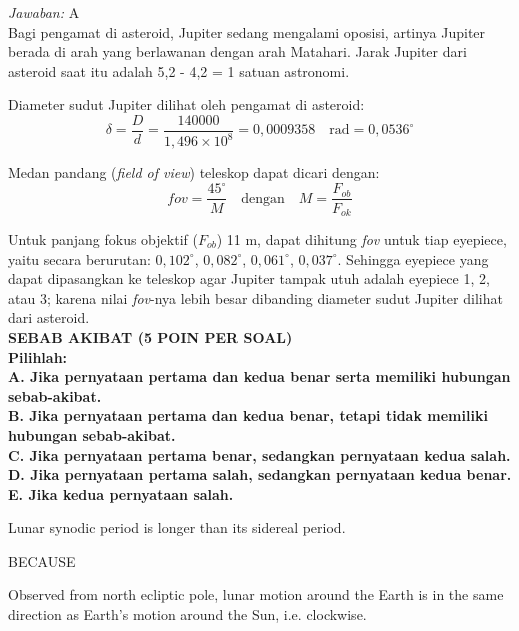 \documentclass[11pt,fleqn]{exam}
\begin{document}
\begin{questions}
\textit{Jawaban: } A\\

Bagi pengamat di asteroid, Jupiter sedang mengalami oposisi, artinya Jupiter berada di arah yang berlawanan dengan arah Matahari. Jarak Jupiter dari asteroid saat itu adalah 5,2 - 4,2 = 1 satuan astronomi.

Diameter sudut Jupiter dilihat oleh pengamat di asteroid:
\begin{equation*}
\delta = \frac{D}{d} = \frac{140000}{1,496 \times 10^{8}} = 0,0009358 \quad \text{rad} = 0,0536^{\circ}
\end{equation*}
 
Medan pandang (\textit{field of view}) teleskop dapat dicari dengan:
\begin{equation*}
\textit{fov} = \frac{45^{\circ}}{M} \quad \text{dengan} \quad M = \frac{F_{ob}}{F_{ok}}
\end{equation*} 

Untuk panjang fokus objektif ($F_{ob}$) 11 m, dapat dihitung \textit{fov} untuk tiap eyepiece, yaitu secara berurutan: $0,102^{\circ}$, $0,082^{\circ}$, $0,061^{\circ}$, $0,037^{\circ}$. Sehingga eyepiece yang dapat dipasangkan ke teleskop agar Jupiter tampak utuh adalah eyepiece 1, 2, atau 3; karena nilai \textit{fov}-nya lebih besar dibanding diameter sudut Jupiter dilihat dari asteroid.\\




\vspace{0.5cm}
\textbf{SEBAB AKIBAT (5 POIN PER SOAL)\\
Pilihlah:\\
A. Jika pernyataan pertama dan kedua benar serta memiliki hubungan sebab-akibat.\\
B. Jika pernyataan pertama dan kedua benar, tetapi tidak memiliki hubungan sebab-akibat.\\
C. Jika pernyataan pertama benar, sedangkan pernyataan kedua salah.\\
D. Jika pernyataan pertama salah, sedangkan pernyataan kedua benar.\\
E. Jika kedua pernyataan salah.\\
}

\question Lunar synodic period is longer than its sidereal period.
\begin{center}
BECAUSE
\end{center}
Observed from north ecliptic pole, lunar motion around the Earth is in the same direction as Earth's motion around the Sun, i.e. clockwise.\\


\end{questions}
\end{document}
